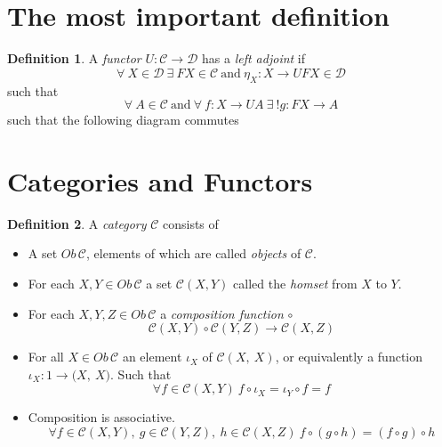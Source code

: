 \documentclass{article}
\theoremstyle{definition}
\newtheorem{definition}{Definition}[section]
\begin{document}
\section{The most important definition}
\begin{definition}
	A \textit{functor} $U : \mathcal{C} \rightarrow \mathcal{D}$ has a \textit{left adjoint} if
		$$
		\forall\ X \in \mathcal{D}
		\ \exists
		\ FX \in \mathcal{C} \ \textrm{and}\ \eta_X : X \rightarrow UFX \in \mathcal{D}
		$$
		such that
		$$
		\forall\ A \in \mathcal{C}\ \textrm{and}\ \forall\ f : X \rightarrow UA
		\ \exists
		\ !g : FX \rightarrow A
		$$
		such that the following diagram commutes
\end{definition}

\begin{center}
\end{center}

\section{Categories and Functors}

\begin{definition}
	A \textit{category} $\mathcal{C}$ consists of
	\begin{itemize}
		\item A set $Ob\,\mathcal{C}$, elements of which are called \textit{objects} of $\mathcal{C}$.
		\item For each $X, Y \in Ob\,\mathcal{C}$
			a set $\mathcal{C}(X,Y)$ called the \textit{homset} from $X$ to $Y$.
		\item For each $X, Y, Z \in Ob\,\mathcal{C}$ a \textit{composition function} $\circ$
			$$\mathcal{C}(X,Y) \circ \mathcal{C}(Y,Z) \rightarrow \mathcal{C}(X,Z)$$
		\item For all $X \in Ob\,\mathcal{C}$ an element $\iota_X$ of $\mathcal{C}(X,\ X)$,
			or equivalently a function $\iota_X : 1 \rightarrow \mathcal(X,\ X)$.
			Such that
			$$\forall f \in \mathcal{C}(X,Y)\ f \circ \iota_X = \iota_Y \circ f = f$$
		\item Composition is associative.
			$$\forall
			  f \in \mathcal{C}(X,Y),
			\ g \in \mathcal{C}(Y,Z),
			\ h \in \mathcal{C}(X,Z)
			\ f \circ (g \circ h) = (f \circ g) \circ h
			$$
	\end{itemize}
\end{definition}
\end{document}
